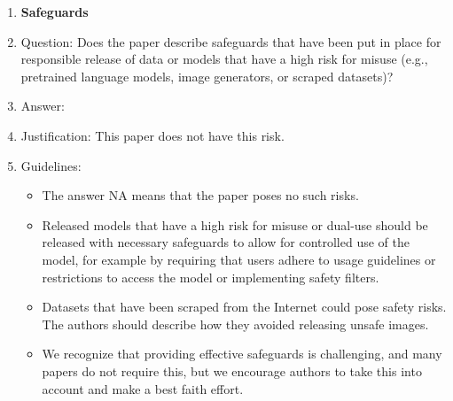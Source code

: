 \documentclass{article}
\begin{document}
\begin{enumerate}
\item {\bf Safeguards}
    \item[] Question: Does the paper describe safeguards that have been put in place for responsible release of data or models that have a high risk for misuse (e.g., pretrained language models, image generators, or scraped datasets)?
    \item[] Answer: \answerNo{} %
    \item[] Justification: This paper does not have this risk.
    \item[] Guidelines:
    \begin{itemize}
        \item The answer NA means that the paper poses no such risks.
        \item Released models that have a high risk for misuse or dual-use should be released with necessary safeguards to allow for controlled use of the model, for example by requiring that users adhere to usage guidelines or restrictions to access the model or implementing safety filters. 
        \item Datasets that have been scraped from the Internet could pose safety risks. The authors should describe how they avoided releasing unsafe images.
        \item We recognize that providing effective safeguards is challenging, and many papers do not require this, but we encourage authors to take this into account and make a best faith effort.
    \end{itemize}


\end{enumerate}
\end{document}
